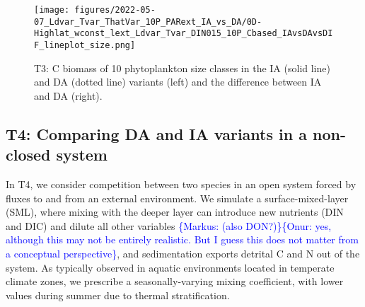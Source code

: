 \documentclass[gmd, manuscript]{copernicus}
\newcommand{\onur}[1]{\textcolor{blue}{\{Onur: #1\}}}
\newcommand{\markus}[1]{\textcolor{blue}{\{Markus: #1\}}}
\begin{document}
\begin{figure}[ht!]
\texttt{[image: figures/2022-05-07\_Ldvar\_Tvar\_ThatVar\_10P\_PARext\_IA\_vs\_DA/0D-Highlat\_wconst\_lext\_Ldvar\_Tvar\_DIN015\_10P\_Cbased\_IAvsDAvsDIF\_lineplot\_size.png]}
\caption{T3: C biomass of 10 phytoplankton size classes in the IA (solid line) and DA (dotted line) variants (left) and the difference between IA and DA (right).
\label{f.T3res}}
\end{figure}


\FloatBarrier%
\subsection{T4: Comparing DA and IA variants in a non-closed system}\label{s.resT4}

In T4, we consider competition between two species in an open system forced by fluxes to and from an external environment.  We simulate a surface-mixed-layer (SML), where mixing with the deeper layer can introduce new nutrients (DIN and DIC) and dilute all other variables \markus{(also DON?)}\onur{yes, although this may not be entirely realistic. But I guess this does not matter from a conceptual perspective}, and sedimentation exports detrital C and N out of the system. As typically observed in aquatic environments located in temperate climate zones, we prescribe a seasonally-varying mixing coefficient, with lower values during summer due to thermal stratification. 
\end{document}
